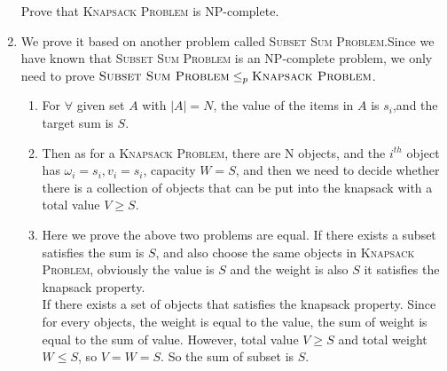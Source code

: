 \documentclass[12pt,a4paper]{article}
\makeatletter
\newtheorem*{solution}{Solution}
\theoremstyle{definition}
\renewenvironment{solution}[1][Solution] {\par\pushQED{\qed}\normalfont\topsep6\p@\@plus6\p@\relax\trivlist\item[\hskip\labelsep\bfseries#1\@addpunct{.}]\ignorespaces}{\popQED\endtrivlist\@endpefalse} \makeatother
\makeatother
\begin{document}
\begin{enumerate}
    Prove that \textsc{Knapsack Problem} is NP-complete.
    \begin{solution}
    We prove it based on another problem called \textsc{Subset Sum Problem}.Since we have known that \textsc{Subset Sum Problem} is an NP-complete problem, we only need to prove $\textsc{Subset Sum Problem}\leq_p\textsc{Knapsack Problem}$.
    \begin{enumerate}
        \item For $\forall$ given set $A$ with $|A|=N$, the value of the items in $A$ is $s_i$,and the target sum is $S$.
        \item Then as for a \textsc{Knapsack Problem}, there are N objects, and the $i^{th}$ object has $\omega_i=s_i,v_i=s_i$, capacity $W=S$, and then we need to decide whether there is a collection of objects that can be put into the knapsack with a total value $V\ge S$.\\
        \item Here we prove the above two problems are equal.
        If there exists a subset satisfies the sum is $S$, and also choose the same objects in \textsc{Knapsack Problem}, obviously the value is $S$ and the weight is also $S$ it satisfies the knapsack property.\\
        If there exists a set of objects that satisfies the knapsack property. Since for every objects, the weight is equal to the value, the sum of weight is equal to the sum of value. However, total value $V\ge S$ and total weight $W\le S$, so $V=W=S$. So the sum of subset is $S$.
    \end{enumerate}
    \end{solution}
\end{enumerate}


\newpage


\end{document}
